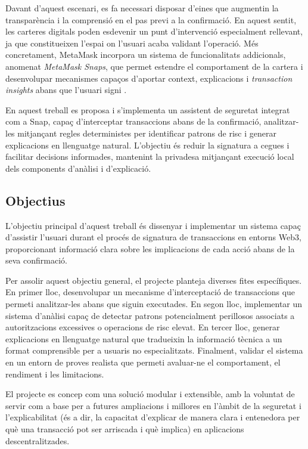 Davant d’aquest escenari, es fa necessari disposar d’eines que augmentin la transparència i la comprensió en el pas previ a la confirmació. En aquest sentit, les carteres digitals poden esdevenir un punt d’intervenció especialment rellevant, ja que constitueixen l’espai on l’usuari acaba validant l’operació. Més concretament, MetaMask incorpora un sistema de funcionalitats addicionals, anomenat \textit{MetaMask Snaps}, que permet estendre el comportament de la cartera i desenvolupar mecanismes capaços d’aportar context, explicacions i \textit{transaction insights} abans que l’usuari signi \cite{metamask_tx_insights,metamask_entrypoints,metamask_permissions,consensys_snaps_launch}.

En aquest treball es proposa i s’implementa un assistent de seguretat integrat com a Snap, capaç d’interceptar transaccions abans de la confirmació, analitzar-les mitjançant regles deterministes per identificar patrons de risc i generar explicacions en llenguatge natural. L’objectiu és reduir la signatura a cegues i facilitar decisions informades, mantenint la privadesa mitjançant execució local dels components d’anàlisi i d’explicació.

\subsection{Objectius}

L’objectiu principal d’aquest treball és dissenyar i implementar un sistema capaç d’assistir l’usuari durant el procés de signatura de transaccions en entorns Web3, proporcionant informació clara sobre les implicacions de cada acció abans de la seva confirmació.

Per assolir aquest objectiu general, el projecte planteja diverses fites específiques. En primer lloc, desenvolupar un mecanisme d’interceptació de transaccions que permeti analitzar-les abans que siguin executades. En segon lloc, implementar un sistema d’anàlisi capaç de detectar patrons potencialment perillosos associats a autoritzacions excessives o operacions de risc elevat. En tercer lloc, generar explicacions en llenguatge natural que tradueixin la informació tècnica a un format comprensible per a usuaris no especialitzats. Finalment, validar el sistema en un entorn de proves realista que permeti avaluar-ne el comportament, el rendiment i les limitacions.


El projecte es concep com una solució modular i extensible, amb la voluntat de servir com a base per a futures ampliacions i millores en l’àmbit de la seguretat i l’explicabilitat (és a dir, la capacitat d’explicar de manera clara i entenedora per què una transacció pot ser arriscada i què implica) en aplicacions descentralitzades.

